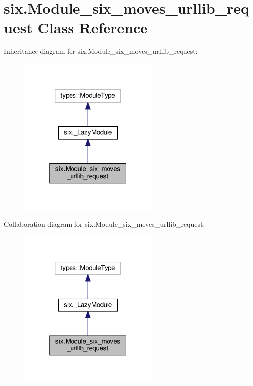 \hypertarget{classsix_1_1Module__six__moves__urllib__request}{}\section{six.\+Module\+\_\+six\+\_\+moves\+\_\+urllib\+\_\+request Class Reference}
\label{classsix_1_1Module__six__moves__urllib__request}


Inheritance diagram for six.\+Module\+\_\+six\+\_\+moves\+\_\+urllib\+\_\+request\+:
\nopagebreak
\begin{figure}[H]
\begin{center}
\leavevmode
\includegraphics[width=196pt]{classsix_1_1Module__six__moves__urllib__request__inherit__graph}
\end{center}
\end{figure}


Collaboration diagram for six.\+Module\+\_\+six\+\_\+moves\+\_\+urllib\+\_\+request\+:
\nopagebreak
\begin{figure}[H]
\begin{center}
\leavevmode
\includegraphics[width=196pt]{classsix_1_1Module__six__moves__urllib__request__coll__graph}
\end{center}
\end{figure}
